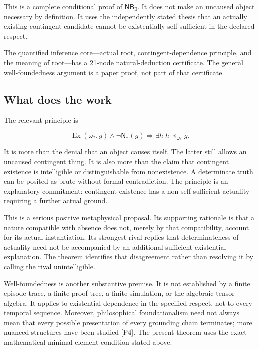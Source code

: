 \documentclass[11pt,a4paper]{article}
\begin{document}
This is a complete conditional proof of \(\mathsf{NB}_{\exists}\). It
does not make an uncaused object necessary by definition. It uses the
independently stated thesis that an actually existing contingent
candidate cannot be existentially self-sufficient in the declared
respect.

The quantified inference core---actual root, contingent-dependence
principle, and the meaning of root---has a 21-node natural-deduction
certificate. The general well-foundedness argument is a paper proof, not
part of that certificate.

\subsection{What does the work}\label{what-does-the-work}

The relevant principle is

\nopagebreak[4]

\[
\operatorname{Ex}(\omega_*,g)\land\neg\mathsf N_{\exists}(g)
\Longrightarrow
\exists h\; h\prec_{\omega_*}g.
\]

It is more than the denial that an object causes itself. The latter
still allows an uncaused contingent thing. It is also more than the
claim that contingent existence is intelligible or distinguishable from
nonexistence. A determinate truth can be posited as brute without formal
contradiction. The principle is an explanatory commitment: contingent
existence has a non-self-sufficient actuality requiring a further actual
ground.

This is a serious positive metaphysical proposal. Its supporting
rationale is that a nature compatible with absence does not, merely by
that compatibility, account for its actual instantiation. Its strongest
rival replies that determinateness of actuality need not be accompanied
by an additional sufficient existential explanation. The theorem
identifies that disagreement rather than resolving it by calling the
rival unintelligible.

Well-foundedness is another substantive premise. It is not established
by a finite episode trace, a finite proof tree, a finite simulation, or
the algebraic tensor algebra. It applies to existential dependence in
the specified respect, not to every temporal sequence. Moreover,
philosophical foundationalism need not always mean that every possible
presentation of every grounding chain terminates; more nuanced
structures have been studied {[}P4{]}. The present theorem uses the
exact mathematical minimal-element condition stated above.
\end{document}

